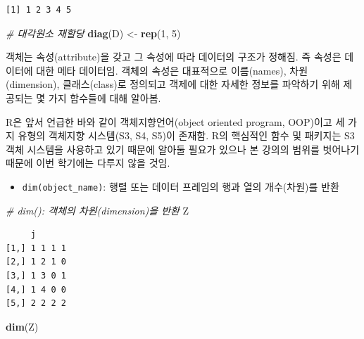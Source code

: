 \documentclass[
  11pt,
]{krantz}
\newenvironment{Shaded}{\begin{snugshade}}{\end{snugshade}}
\newcommand{\CommentTok}[1]{\textcolor[rgb]{0.37,0.37,0.37}{\textit{#1}}}
\newcommand{\DecValTok}[1]{\textcolor[rgb]{0.06,0.06,0.06}{#1}}
\newcommand{\KeywordTok}[1]{\textcolor[rgb]{0.27,0.27,0.27}{\textbf{#1}}}
\newcommand{\NormalTok}[1]{#1}
\newcommand{\StringTok}[1]{\textcolor[rgb]{0.5,0.5,0.5}{#1}}
\providecommand{\tightlist}{%
  \setlength{\itemsep}{0pt}\setlength{\parskip}{0pt}}
\let\BeginKnitrBlock\begin \let\EndKnitrBlock\end
\begin{document}
\begin{verbatim}
[1] 1 2 3 4 5
\end{verbatim}

\begin{Shaded}
\begin{Highlighting}[]
\CommentTok{# 대각원소 재할당}
\KeywordTok{diag}\NormalTok{(D) <-}\StringTok{ }\KeywordTok{rep}\NormalTok{(}\DecValTok{1}\NormalTok{, }\DecValTok{5}\NormalTok{)}
\end{Highlighting}
\end{Shaded}

\normalsize

\footnotesize

\BeginKnitrBlock{rmdnote}
객체는 속성(attribute)을 갖고 그 속성에 따라 데이터의 구조가 정해짐. 즉 속성은 데이터에 대한 메타 데이터임. 객체의 속성은 대표적으로 이름(names), 차원(dimension), 클래스(class)로 정의되고 객제에 대한 자세한 정보를 파악하기 위해 제공되는 몇 가지 함수들에 대해 알아봄.

R은 앞서 언급한 바와 같이 객체지향언어(object oriented program, OOP)이고 세 가지 유형의 객체지향 시스템(S3, S4, S5)이 존재함. R의 핵심적인 함수 및 패키지는 S3 객체 시스템을 사용하고 있기 때문에 알아둘 필요가 있으나 본 강의의 범위를 벗어나기 때문에 이번 학기에는 다루지 않을 것임.
\EndKnitrBlock{rmdnote}

\normalsize

\begin{itemize}
\tightlist
\item
  \texttt{dim(object\_name)}: 행렬 또는 데이터 프레임의 행과 열의 개수(차원)를 반환
\end{itemize}

\footnotesize

\begin{Shaded}
\begin{Highlighting}[]
\CommentTok{# dim(): 객체의 차원(dimension)을 반환}
\NormalTok{Z}
\end{Highlighting}
\end{Shaded}

\begin{verbatim}
     j      
[1,] 1 1 1 1
[2,] 1 2 1 0
[3,] 1 3 0 1
[4,] 1 4 0 0
[5,] 2 2 2 2
\end{verbatim}

\begin{Shaded}
\begin{Highlighting}[]
\KeywordTok{dim}\NormalTok{(Z)}
\end{Highlighting}
\end{Shaded}
\end{document}
